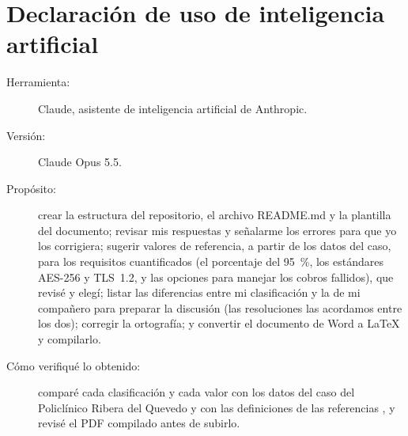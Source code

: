 \documentclass[11pt,a4paper]{article}
\begin{document}
\section{Declaración de uso de inteligencia artificial}
\begin{description}
	\item[Herramienta:] Claude, asistente de inteligencia artificial de Anthropic.
	\item[Versión:] Claude Opus 5.5.
	\item[Propósito:] crear la estructura del repositorio, el archivo README.md y la plantilla del documento; revisar mis respuestas y señalarme los errores para que yo los corrigiera; sugerir valores de referencia, a partir de los datos del caso, para los requisitos cuantificados (el porcentaje del 95~\%, los estándares AES-256 y TLS~1.2, y las opciones para manejar los cobros fallidos), que revisé y elegí; listar las diferencias entre mi clasificación y la de mi compañero para preparar la discusión (las resoluciones las acordamos entre los dos); corregir la ortografía; y convertir el documento de Word a \LaTeX{} y compilarlo.
	\item[Cómo verifiqué lo obtenido:] comparé cada clasificación y cada valor con los datos del caso del Policlínico Ribera del Quevedo y con las definiciones de las referencias \cite{pohl2025, iso29148, iso25010}, y revisé el PDF compilado antes de subirlo.
\end{description}



\end{document}
